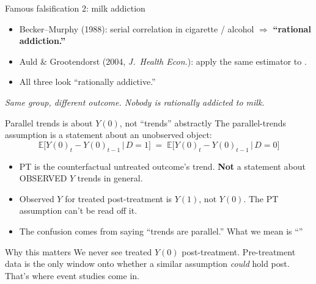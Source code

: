 \documentclass[aspectratio=169,11pt]{beamer}
\begin{document}
\begin{frame}{Famous falsification 2: milk addiction}
\vspace{0.6em}
\begin{itemize}\setlength\itemsep{0.5em}
  \item Becker--Murphy (1988): \;serial correlation in cigarette / alcohol $\Rightarrow$ \textbf{``rational addiction.''}
  \item Auld \& Grootendorst (2004, \textit{J.\ Health Econ.}): \;apply the same estimator to .
  \item All three look ``rationally addictive.''
\end{itemize}
\vspace{0.8em}
\begin{center}
\small\color{warmgray}\itshape
Same group, different outcome. \;Nobody is rationally addicted to milk. \;
\end{center}
\vspace{0.4em}
\end{frame}

\begin{frame}{Parallel trends is about $Y(0)$, not ``trends'' abstractly}
\footnotesize
The parallel-trends assumption is a statement about an unobserved object:
\vspace{-0.3em}
\[
\mathbb{E}\!\big[Y(0)_{t} - Y(0)_{t-1} \,\big|\, D{=}1\big] \;=\; \mathbb{E}\!\big[Y(0)_{t} - Y(0)_{t-1} \,\big|\, D{=}0\big]
\]
\vspace{-0.4em}
\begin{itemize}\setlength\itemsep{2pt}
  \item PT is the counterfactual untreated outcome's trend. \;\textbf{Not} a statement about OBSERVED $Y$ trends in general.
  \item Observed $Y$ for treated post-treatment is $Y(1)$, not $Y(0)$. \;The PT assumption can't be read off it.
  \item The confusion comes from saying ``trends are parallel.'' \;What we mean is ``''
\end{itemize}
\begin{block}{Why this matters}
\scriptsize
We never see treated $Y(0)$ post-treatment. \;Pre-treatment data is the only window onto whether a similar assumption \textit{could} hold post. \;That's where event studies come in.
\end{block}
\end{frame}
\end{document}
